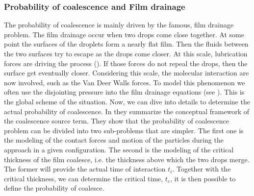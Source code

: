 \subsubsection{Probability of coalescence and Film drainage}

The probability of coalescence is mainly driven by the famous, film drainage problem. 
The film drainage occur when two drops come close together.
At some point the surfaces of the droplets form a nearly flat film. 
Then the fluids between the two surfaces try to escape as the drops come closer. 
At this scale, lubrication forces are driving the process (\citet[Section 4.3]{guazzelli2011}). 
If those forces do not repeal the drops, then the surface get eventually closer.
Considering this scale, the molecular interaction are now involved, such as the Van Deer Walls forces.
To model this phenomenon we often use the disjointing pressure into the film drainage equations (see \citet{de2015gouttes}). 
This is the global scheme of the situation. 
Now, we can dive into details to determine the actual probability of coalescence. 
In \citet[Figure 1]{chesters1991modelling} they summarize the conceptual framework of the coalescence source term. 
They show that the probability of coalescence problem can be divided into two sub-problems that are simpler. 
The first one is the modeling of the contact forces and motion of the particles during the approach in a given configuration.
The second is the modeling of the critical thickness of the film coalesce, i.e. the thickness above which the two drops merge.
The former will provide the actual time of interaction $t_i$. 
Together with the critical thickness, we can determine the critical time, $t_c$, it is then possible to define the probability of coalesce. 

